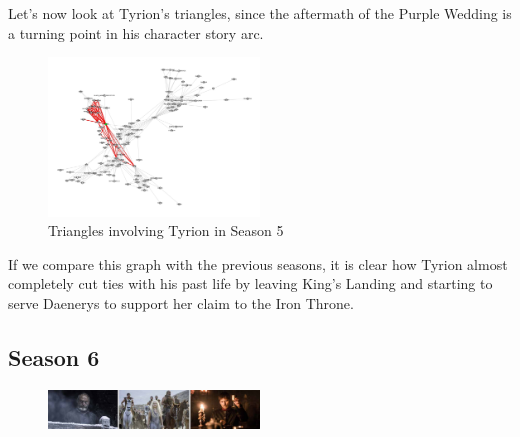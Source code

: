 \documentclass[10pt,twocolumn,letterpaper]{article}
\begin{document}
Let's now look at Tyrion's triangles, since the aftermath of the Purple Wedding is a turning point in his character story arc.

\begin{figure}[!h]
    \centering
    \includegraphics[width=0.5\textwidth]{img/s5/triangles_tyrion.jpg}
    \caption{\small{Triangles involving Tyrion in Season 5}}
\end{figure}


If we compare this graph with the previous seasons, it is clear how Tyrion almost completely cut ties with his past life by leaving King's Landing and starting to serve Daenerys to support her claim to the Iron Throne.

\begin{center}
    \vspace{2cm}
\end{center}

\subsection{Season 6}

\begin{figure}[!h]
    \centering
    \includegraphics[width=0.5\textwidth]{img/s6/s6_frames.jpg}
\end{figure}
\end{document}
